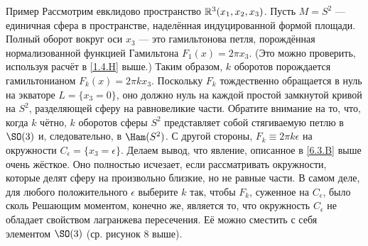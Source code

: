\begin{thm}{Пример}\label{6.3.C}
Рассмотрим евклидово пространство $\mathbb{R}^3 (x_1, x_2, x_3)$.
Пусть $M = S^2$ --- единичная сфера в пространстве, наделённая
индуцированной формой площади. 
Полный оборот вокруг оси $x_3$ --- это гамильтонова петля, порождённая
нормализованной функцией Гамильтона $F_1 (x) = 2\pi x_3$. 
(Это можно проверить, используя расчёт в \ref{1.4.H} выше.)
Таким образом, $k$ оборотов порождается гамильтонианом $F_k (x) = 2\pi k x_3$.
Поскольку $F_k$ тождественно обращается в нуль на экваторе $L = \{x_3
= 0\}$, оно должно  нуль на каждой простой
замкнутой кривой на $S^2$, разделяющей сферу на равновеликие части. 
Обратите внимание на то, что, когда $k$ чётно, $k$ оборотов сферы
$S^2$ представляет собой стягиваемую петлю в $\SO (3)$ и,
следовательно, в $\Ham (S^2)$. 
С другой стороны, $F_k \equiv 2\pi k\epsilon$ на окружности
$C_\epsilon = \{x_3 = \epsilon\}$. 
Делаем вывод, что явление, описанное в \ref{6.3.B} выше очень жёсткое.
Оно полностью исчезает, если рассматривать окружности, которые делят
сферу на произвольно близкие, но не равные части. 
В самом деле, для любого положительного $\epsilon$ выберите $k$ так,
чтобы $F_k$, суженное на $C_\epsilon$, было сколь 
Решающим моментом, конечно же, является то, что окружность
$C_\epsilon$ не обладает свойством лагранжева пересечения. 
Её можно сместить с себя элементом $\SO (3)$ (ср. рисунок 8 выше). 
\end{thm}
